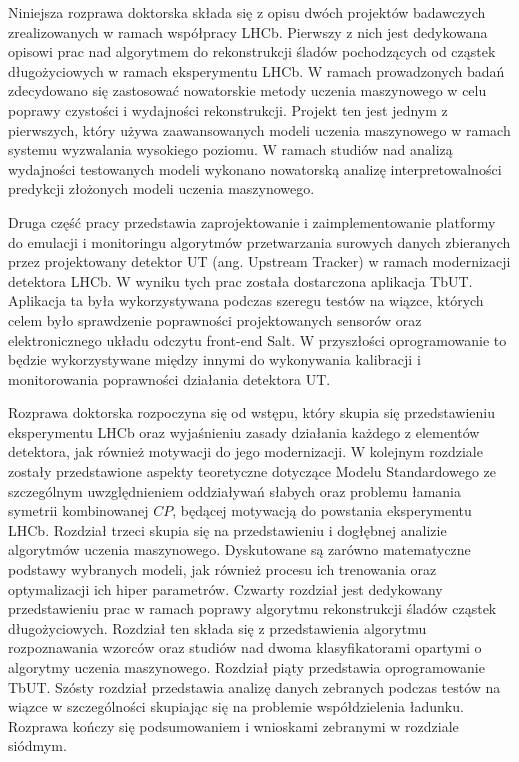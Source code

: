 
Niniejsza rozprawa doktorska składa się z opisu dwóch projektów badawczych zrealizowanych w ramach współpracy LHCb. Pierwszy z nich jest dedykowana opisowi prac nad algorytmem do rekonstrukcji śladów pochodzących od cząstek długożyciowych w ramach eksperymentu LHCb. W ramach prowadzonych badań zdecydowano się zastosować nowatorskie metody uczenia maszynowego w celu poprawy czystości i wydajności rekonstrukcji. Projekt ten jest jednym z pierwszych, który używa zaawansowanych modeli uczenia maszynowego w ramach systemu wyzwalania wysokiego poziomu. W ramach studiów nad analizą wydajności testowanych modeli wykonano nowatorską analizę interpretowalności predykcji złożonych modeli uczenia maszynowego. 

 Druga część pracy przedstawia zaprojektowanie i zaimplementowanie platformy do emulacji i monitoringu algorytmów przetwarzania surowych danych zbieranych przez projektowany detektor UT (ang. Upstream Tracker) w ramach modernizacji detektora LHCb. W wyniku tych prac została dostarczona aplikacja TbUT. Aplikacja ta była wykorzystywana podczas szeregu testów na wiązce, których celem było sprawdzenie poprawności projektowanych sensorów oraz elektronicznego układu odczytu front-end Salt. W przyszłości oprogramowanie to będzie wykorzystywane między innymi do wykonywania kalibracji i monitorowania poprawności działania detektora UT.  


Rozprawa doktorska rozpoczyna się od wstępu, który skupia się przedstawieniu eksperymentu LHCb oraz wyjaśnieniu zasady działania każdego z elementów detektora, jak również motywacji do jego modernizacji. W kolejnym rozdziale zostały przedstawione aspekty teoretyczne dotyczące Modelu Standardowego ze szczególnym uwzględnieniem oddziaływań słabych oraz problemu łamania symetrii kombinowanej $CP$, będącej motywacją do powstania eksperymentu LHCb. Rozdział trzeci skupia się na przedstawieniu i dogłębnej analizie algorytmów uczenia maszynowego. Dyskutowane są zarówno matematyczne podstawy wybranych modeli, jak również procesu ich trenowania oraz optymalizacji ich hiper parametrów. Czwarty rozdział jest dedykowany przedstawieniu prac w ramach poprawy algorytmu rekonstrukcji śladów cząstek długożyciowych. Rozdział ten składa się z przedstawienia algorytmu rozpoznawania wzorców oraz studiów nad dwoma klasyfikatorami opartymi o algorytmy uczenia maszynowego. Rozdział  piąty przedstawia oprogramowanie TbUT. Szósty rozdział przedstawia analizę danych zebranych podczas testów na wiązce w szczególności skupiając się na problemie współdzielenia ładunku. Rozprawa kończy się  podsumowaniem i wnioskami zebranymi w rozdziale siódmym. 
